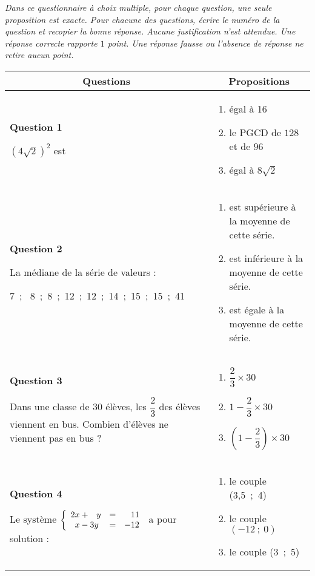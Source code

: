 
\medskip

\emph{Dans ce questionnaire à choix multiple, pour chaque question, une seule proposition
est exacte. Pour chacune des questions, écrire le numéro de la question et recopier
la bonne réponse. Aucune justification n'est attendue. Une réponse correcte rapporte
$1$ point. Une réponse fausse ou l'absence de réponse ne retire aucun point.}

\medskip
\begin{tabularx}{\linewidth}{|X|X|}\hline
\multicolumn{1}{|c|}{Questions}&\multicolumn{1}{|c|}{Propositions}\\ \hline
\textbf{Question 1}

$\left(4\sqrt{2}\right)^2$ est&
\begin{enumerate}
\item égal à 16
\item  le PGCD de $128$ et de $96$
\item égal à $8\sqrt{2}$
\end{enumerate}\\ \hline
\textbf{Question 2}

La médiane de la série de valeurs :

7~;~ 8~;~8~;~12~;~12~;~14~;~15~;~15~;~41&
\begin{enumerate}
\item est supérieure à la moyenne de cette série.
\item est inférieure à la moyenne de cette série.
\item est égale à la moyenne de cette série.
\end{enumerate}\\ \hline
\textbf{Question 3}

Dans une classe de 30 élèves, les $\dfrac{2}{3}$ des élèves
viennent en bus. Combien d'élèves ne viennent pas en bus ?&
\begin{enumerate}
\item $\dfrac{2}{3} \times  30$
\item $1 - \dfrac{2}{3} \times 30$
\item $\left(1 - \dfrac{2}{3}\right) \times 30$
\end{enumerate}\\ \hline
\textbf{Question 4}

Le système $\left\{\begin{array}{l c r}
2x+ \phantom{-}y	&=&11\\
\phantom{2}x - 3y 	&=&- 12
\end{array}\right.$ a pour solution :&
\begin{enumerate}
\item le couple (3,5~;~4)
\item le couple $(- 12~;~0)$
\item le couple (3~;~5)
\end{enumerate}\\ \hline
\end{tabularx}
\medskip

\vspace{0.25cm}

